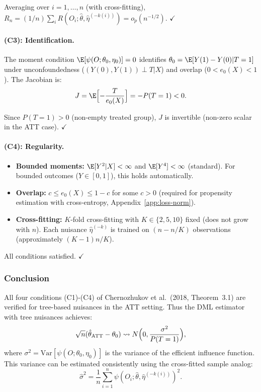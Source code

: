 Averaging over $i = 1, \ldots, n$ (with cross-fitting), $R_n = (1/n)\sum_i R(O_i; \hat\theta, \hat\eta^{(-k(i))}) = o_p(n^{-1/2})$. $\checkmark$

\paragraph{(C3): Identification.}
The moment condition $\E[\psi(O; \theta_0, \eta_0)] = 0$ identifies $\theta_0 = \E[Y(1) - Y(0) | T = 1]$ under unconfoundedness ($(Y(0), Y(1)) \perp T | X$) and overlap ($0 < e_0(X) < 1$). The Jacobian is:
\[
J = \E\Bigl[ -\frac{T}{e_0(X)} \Bigr] = -P(T = 1) < 0.
\]

Since $P(T = 1) > 0$ (non-empty treated group), $J$ is invertible (non-zero scalar in the ATT case). $\checkmark$

\paragraph{(C4): Regularity.}
\begin{itemize}
\item \textbf{Bounded moments:} $\E[Y^2 | X] < \infty$ and $\E[Y^4] < \infty$ (standard). For bounded outcomes ($Y \in [0,1]$), this holds automatically.
\item \textbf{Overlap:} $c \le e_0(X) \le 1-c$ for some $c > 0$ (required for propensity estimation with cross-entropy, Appendix~\ref{app:loss-norm}).
\item \textbf{Cross-fitting:} $K$-fold cross-fitting with $K \in \{2, 5, 10\}$ fixed (does not grow with $n$). Each nuisance $\hat\eta^{(-k)}$ is trained on $(n - n/K)$ observations (approximately $(K-1)n/K$).
\end{itemize}

All conditions satisfied. $\checkmark$

\subsubsection{Conclusion}

All four conditions (C1)-(C4) of Chernozhukov et al.\ (2018, Theorem~3.1) are verified for tree-based nuisances in the ATT setting. Thus the DML estimator with tree nuisances achieves:
\[
\sqrt{n}(\hat\theta_{\text{ATT}} - \theta_0) \leadsto N\Bigl(0, \frac{\sigma^2}{P(T=1)}\Bigr),
\]
where $\sigma^2 = \text{Var}[\psi(O; \theta_0, \eta_0)]$ is the variance of the efficient influence function. This variance can be estimated consistently using the cross-fitted sample analog:
\[
\hat\sigma^2 = \frac{1}{n} \sum_{i=1}^n \psi(O_i; \hat\theta, \hat\eta^{(-k(i))})^2.
\]
